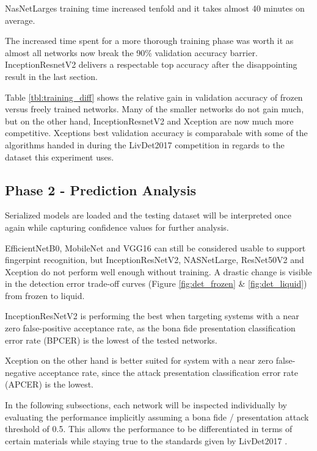 


NasNetLarges training time increased tenfold and it takes almost 40 minutes on average.



The increased time spent for a more thorough training phase was worth it as almost all networks now break the 90\% validation accuracy barrier.
InceptionResnetV2 delivers a respectable top accuracy after the disappointing result in the last section.





Table \ref{tbl:training_diff} shows the relative gain in validation accuracy of frozen versus freely trained networks.
Many of the smaller networks do not gain much, but on the other hand, InceptionResnetV2 and Xception are now much more competitive.
Xceptions best validation accuracy is comparabale with some of the algorithms handed in during the LivDet2017 competition in regards to the dataset this experiment uses. \cite{LIVDET}

\subsection{Phase 2 - Prediction Analysis}
Serialized models are loaded and the testing dataset will be interpreted once again while capturing confidence values for further analysis.

EfficientNetB0, MobileNet and VGG16 can still be considered usable to support fingerpint recognition, but InceptionResNetV2, NASNetLarge, ResNet50V2 and Xception do not perform well enough without training.
A drastic change is visible in the detection error trade-off curves (Figure \ref{fig:det_frozen} \& \ref{fig:det_liquid}) from frozen to liquid.

InceptionResNetV2 is performing the best when targeting systems with a near zero false-positive acceptance rate, as the bona fide presentation classification error rate (BPCER) is the lowest of the tested networks.

Xception on the other hand is better suited for system with a near zero false-negative acceptance rate, since the attack presentation classification error rate (APCER) is the lowest.





In the following subsections, each network will be inspected individually by evaluating the performance implicitly assuming a bona fide / presentation attack threshold of 0.5.
This allows the performance to be differentiated in terms of certain materials while staying true to the standards given by LivDet2017 \cite{LIVDET}.

